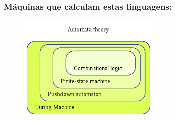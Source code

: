 \documentclass[10pt]{beamer}
\begin{document}
\begin{frame}[fragile]
\frametitle{Máquinas que calculam estas linguagens: }
\begin{figure}[!ht]
	\centering
	\includegraphics[height =.6\textheight,width=.6\textwidth]
	{figuras/circuitos_a_MT.png}
\end{figure}

\end{frame}
\end{document}
